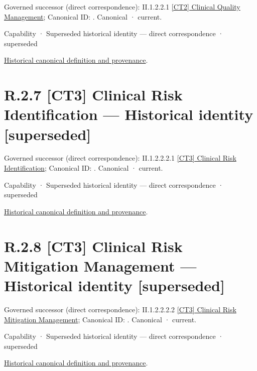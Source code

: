 {\small Governed successor (direct correspondence): II.1.2.2.1 \hyperref[element:89761f2d38f846c39df1df0975964288]{[CT2] Clinical Quality Management}; Canonical ID: \texttt{}. Canonical · current.}\par
\label{element:dc1bece79eb7452e951d03a2ee6dfaa6}
{\small Capability · Superseded historical identity — direct correspondence · superseded}\par
\href{../../../../continuum/strategy/capability/dc1bece79eb7452e951d03a2ee6dfaa6.md}{Historical canonical definition and provenance}.\par
\section*{R.2.7 [CT3] Clinical Risk Identification — Historical identity [superseded]}
\label{navigation:R.2.7}

{\small Governed successor (direct correspondence): II.1.2.2.2.1 \hyperref[element:d54c19c6efaf42af82ad71a4142149d4]{[CT3] Clinical Risk Identification}; Canonical ID: \texttt{}. Canonical · current.}\par
\label{element:690da55f1f5b4c44ba58cf67a717a564}
{\small Capability · Superseded historical identity — direct correspondence · superseded}\par
\href{../../../../continuum/strategy/capability/690da55f1f5b4c44ba58cf67a717a564.md}{Historical canonical definition and provenance}.\par
\section*{R.2.8 [CT3] Clinical Risk Mitigation Management — Historical identity [superseded]}
\label{navigation:R.2.8}

{\small Governed successor (direct correspondence): II.1.2.2.2.2 \hyperref[element:2c232ade21ec45619c3ee4e928bd97ee]{[CT3] Clinical Risk Mitigation Management}; Canonical ID: \texttt{}. Canonical · current.}\par
\label{element:0bd3311d89af45bb935fde20e719369c}
{\small Capability · Superseded historical identity — direct correspondence · superseded}\par
\href{../../../../continuum/strategy/capability/0bd3311d89af45bb935fde20e719369c.md}{Historical canonical definition and provenance}.\par
